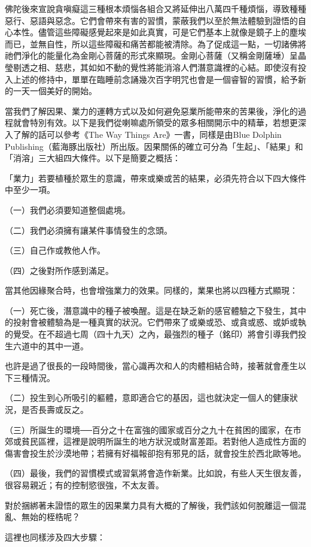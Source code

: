 佛陀後來宣說貪嗔癡這三種根本煩惱各組合又將延伸出八萬四千種煩惱，導致種種惡行、惡語與惡念。它們會帶來有害的習慣，蒙蔽我們以至於無法體驗到證悟的自心本性。儘管這些障礙感覺起來是如此真實，可是它們基本上就像是鏡子上的塵埃而已，並無自性，所以這些障礙和痛苦都能被清除。為了促成這一點，一切諸佛將祂們淨化的能量化為金剛心菩薩的形式來顯現。金剛心菩薩（又稱金剛薩埵）呈晶瑩剔透之相、慈悲，其如如不動的覺性將能消溶人們潛意識裡的心結。即使沒有投入上述的修持中，單單在臨睡前念誦幾次百字明咒也會是一個睿智的習慣，給予新的一天一個美好的開始。

當我們了解因果、業力的運轉方式以及如何避免惡業所能帶來的苦果後，淨化的過程就會特別有效。以下是我們從喇嘛處所領受的眾多相關開示中的精華，若想更深入了解的話可以參考《The
Way Things Are》一書，同樣是由Blue Dolphin
Publishing（藍海豚出版社）所出版。因果關係的確立可分為「生起」、「結果」和「消溶」三大組四大條件。以下是簡要之概括：

「業力」若要植種於眾生的意識，帶來或樂或苦的結果，必須先符合以下四大條件中至少一項。

（一）我們必須要知道整個處境。

（二）我們必須擁有讓某件事情發生的念頭。

（三）自己作或教他人作。

（四）之後對所作感到滿足。

當其他因緣聚合時，也會增強業力的效果。同樣的，業果也將以四種方式顯現：

（一）死亡後，潛意識中的種子被喚醒。這是在缺乏新的感官體驗之下發生，其中的投射會被體驗為是一種真實的狀況。它們帶來了或樂或恐、或貪或惑、或妒或執的覺受。在不超過七周（四十九天）之內，最強烈的種子（銘印）將會引導我們投生六道中的其中一道。

也許是過了很長的一段時間後，當心識再次和人的肉體相結合時，接著就會產生以下三種情況。

（二）投生到心所吸引的軀體，意即適合它的基因，這也就決定一個人的健康狀況，是否長壽或反之。

（三）所誕生的環境──百分之十在富強的國家或百分之九十在貧困的國家，在市郊或貧民區裡，這裡是說明所誕生的地方狀況或財富差距。若對他人造成性方面的傷害會投生於沙漠地帶；若擁有好福報卻抱有邪見的話，就會投生於西北歐等地。

（四）最後，我們的習慣模式或習氣將會造作新業。比如說，有些人天生很友善，很容易親近；有的控制慾很強，不太友善。

對於捆綁著未證悟的眾生的因果業力具有大概的了解後，我們該如何脫離這一個混亂、無始的桎梏呢？

這裡也同樣涉及四大步驟：

